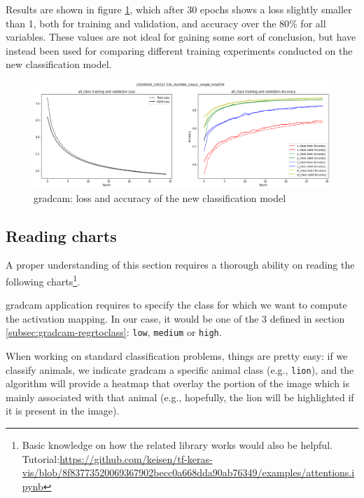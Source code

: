 Results are shown in figure \ref{fig:gradcam-retrain-simple}, which after 30 epochs shows a loss slightly smaller than 1, both for training and validation, and accuracy over the 80\% for all variables. These values are not ideal for gaining some sort of conclusion, but have instead been used for comparing different training experiments conducted on the new classification model.

\begin{figure}[!h]
	\centering
	\includegraphics[width=1\textwidth]{"contents/images/04-metrics-class-simple"}
	\caption[\gls{gradcam}: loss and accuracy of the new classification model]{\gls{gradcam}: loss and accuracy of the new classification model}
	\label{fig:gradcam-retrain-simple}
\end{figure}



\subsection{Reading charts}
\label{subsec:gradcam-reading}

A proper understanding of this section requires a thorough ability on reading the following charts\footnote{Basic knowledge on how the related library works would also be helpful. Tutorial:\url{https://github.com/keisen/tf-keras-vis/blob/8f83773520069367902becc0a668dda90ab76349/examples/attentions.ipynb}}.

\gls{gradcam} application requires to specify the class for which we want to compute the activation mapping. In our case, it would be one of the 3 defined in section \ref{subsec:gradcam-regrtoclass}: \texttt{low}, \texttt{medium} or \texttt{high}. 

When working on standard classification problems, things are pretty easy: if we classify animals, we indicate \gls{gradcam} a specific animal class (e.g., \texttt{lion}), and the algorithm will provide a heatmap that overlay the portion of the image which is mainly associated with that animal (e.g., hopefully, the lion will be highlighted if it is present in the image).

